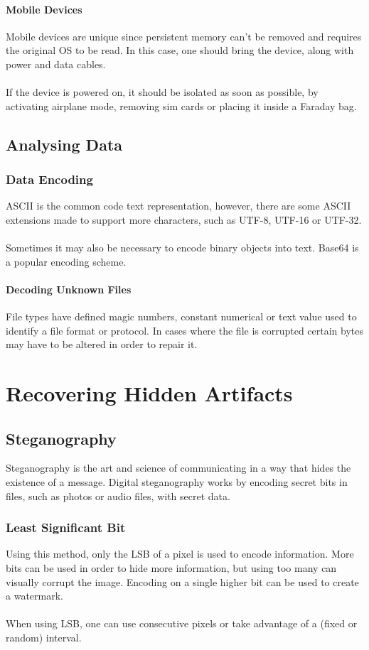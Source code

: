 \documentclass[10pt,a4paper]{report}
\begin{document}
\subsubsection{Mobile Devices}
Mobile devices are unique since persistent memory can't be removed and requires the original OS to be read. In this case, one should bring the device, along with power and data cables.\\
\\
If the device is powered on, it should be isolated as soon as possible, by activating airplane mode, removing sim cards or placing it inside a Faraday bag.
\section{Analysing Data}
\subsection{Data Encoding}
ASCII is the common code text representation, however, there are some ASCII extensions made to support more characters, such as UTF-8, UTF-16 or UTF-32.\\
\\
Sometimes it may also be necessary to encode binary objects into text. Base64 is a popular encoding scheme.
\subsubsection{Decoding Unknown Files}
File types have defined magic numbers, constant numerical or text value used to identify a file format or protocol. In cases where the file is corrupted certain bytes may have to be altered in order to repair it.

\chapter{Recovering Hidden Artifacts}
\section{Steganography}
Steganography is the art and science of communicating in a way that hides the existence of a message. Digital steganography works by encoding secret bits in files, such as photos or audio files, with secret data.
\subsection{Least Significant Bit}
Using this method, only the LSB of a pixel is used to encode information. More bits can be used in order to hide more information, but using too many can visually corrupt the image. Encoding on a single higher bit can be used to create a watermark.\\
\\
When using LSB, one can use consecutive pixels or take advantage of a (fixed or random) interval.
\end{document}
